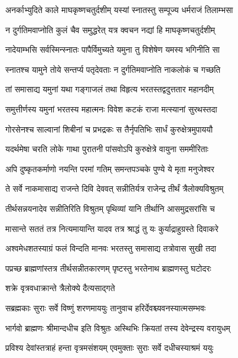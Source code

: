 \twolineshloka
{अनर्काभ्युदिते काले माघकृष्णचतुर्दशीम्}
{यस्यां स्नातस्तु सम्पूज्य धर्मराजं तिलाम्भसा}%

\twolineshloka
{न दुर्गतिमवाप्नोति कुलं चैव समुद्धरेत्}
{यत्र क्वचन नद्यां हि माघकृष्णचतुर्दशीम्}%

\twolineshloka
{नादेयाम्भसि सर्वस्मिन्स्नातः पापैर्विमुच्यते}
{यमुना तु विशेषेण यमस्य भगिनीति सा}%

\twolineshloka
{स्नातश्च यामुने तोये सन्तर्प्य पतृदेवताः}
{न दुर्गतिमवाप्नोति नाकलोकं च गच्छति} %

\twolineshloka
{तां समासाद्य यमुनां यथा गङ्गाजलं तथा}
{विहृत्य भरतस्तद्वदुत्ततार महानदीम्}%

\twolineshloka
{समुत्तीर्णस्य यमुनां भरतस्य महात्मनः}
{विवेश कटकं राजा मत्स्यानां सुरथस्तदा}%

\twolineshloka
{गोरसेनश्च साल्वानां शिबीनां च प्रभद्रकः}
{स तैर्नृपतिभिः सार्धं कुरुक्षेत्रमुपाययौ}%

\twolineshloka
{यदर्थमेषा चरति लोके गाथा पुरातनी}
{पांसवोऽपि कुरुक्षेत्रे वायुना सममीरिताः}%

\twolineshloka
{अपि दुष्कृतकर्माणो नयन्ति परमां गतिम्}
{समन्तपञ्चके पुण्ये ये मृता मनुजेश्वर}%

\twolineshloka
{ते सर्वे नाकमासाद्य राजन्ते दिवि देववत्}
{सन्नीतिर्यत्र राजेन्द्र तीर्थं त्रैलोक्यविश्रुतम्}%

\twolineshloka
{तीर्थसन्नयनादेव सन्नीतिरिति विश्रुतम्}
{पृथिव्यां यानि तीर्थानि आसमुद्रसरांसि च}%

\twolineshloka
{मासान्ते सततं तत्र नित्यमायान्ति यादव}
{तत्र श्राद्धं तु यः कुर्याद्राहुग्रस्ते दिवाकरे}%

\twolineshloka
{अश्वमेधशतस्याग्रं फलं विन्दति मानवः}
{भरतस्तु समासाद्य तत्रोवास सुखी तदा}%

\twolineshloka
{पप्रच्छ ब्राह्मणांस्तत्र तीर्थसन्नीतकारणम्}
{पृष्टस्तु भरतेनाथ ब्राह्मणस्तु घटोदरः} %


\onelineshloka
{शक्रे वृत्रवधाक्रान्ते त्रैलोक्ये दैत्यसाद्गते}%

\twolineshloka
{सब्रह्मकाः सुराः सर्वे विष्णुं शरणमाययुः}
{तानुवाच हरिर्देवश्च्यवनस्यात्मसम्भवः}%

\twolineshloka
{भार्गवो ब्राह्मणः श्रीमान्दधीच इति विश्रुतः}
{अस्थिभिः क्रियतां तस्य देवेन्द्रस्य वरायुधम्}%

\twolineshloka
{प्रविश्य देवांस्तत्राहं हन्ता वृत्रमसंशयम्}
{एवमुक्ताः सुराः सर्वे दधीचस्याश्रमं ययुः}%

